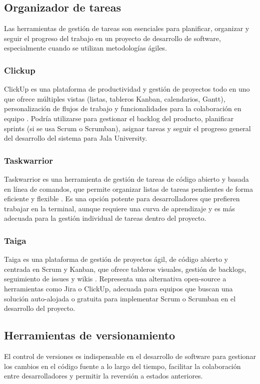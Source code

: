 \subsection{Organizador de tareas}
Las herramientas de gestión de tareas son esenciales para planificar, organizar y seguir el progreso del trabajo en un proyecto de desarrollo de software, especialmente cuando se utilizan metodologías ágiles.

\subsubsection{Clickup}
ClickUp es una plataforma de productividad y gestión de proyectos todo en uno que ofrece múltiples vistas (listas, tableros Kanban, calendarios, Gantt), personalización de flujos de trabajo y funcionalidades para la colaboración en equipo \parencite{ClickUp}.
Podría utilizarse para gestionar el backlog del producto, planificar sprints (si se usa Scrum o Scrumban), asignar tareas y seguir el progreso general del desarrollo del sistema para Jala University.

\subsubsection{Taskwarrior}
Taskwarrior es una herramienta de gestión de tareas de código abierto y basada en línea de comandos, que permite organizar listas de tareas pendientes de forma eficiente y flexible \parencite{Taskwarrior}.
Es una opción potente para desarrolladores que prefieren trabajar en la terminal, aunque requiere una curva de aprendizaje y es más adecuada para la gestión individual de tareas dentro del proyecto.

\subsubsection{Taiga}
Taiga es una plataforma de gestión de proyectos ágil, de código abierto y centrada en Scrum y Kanban, que ofrece tableros visuales, gestión de backlogs, seguimiento de issues y wikis \parencite{Taiga}.
Representa una alternativa open-source a herramientas como Jira o ClickUp, adecuada para equipos que buscan una solución auto-alojada o gratuita para implementar Scrum o Scrumban en el desarrollo del proyecto.

\subsection{Herramientas de versionamiento}
El control de versiones es indispensable en el desarrollo de software para gestionar los cambios en el código fuente a lo largo del tiempo, facilitar la colaboración entre desarrolladores y permitir la reversión a estados anteriores.

